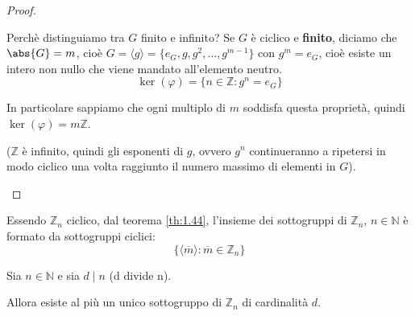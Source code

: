 \documentclass[../main.tex]{subfiles}
\begin{document}
\begin{proof}
    \begin{note}
        Perchè distinguiamo tra $G$ finito e infinito? Se $G$ è ciclico e \textbf{finito}, diciamo che $\abs{G} = m$, cioè $G = \langle g \rangle = \{e_G, g, g^2, \ldots, g^{m-1}\}$ con $g^m = e_G$, cioè esiste un intero non nullo che viene mandato all'elemento neutro.
        \[
            \ker (\varphi) = \{n \in \mathbb{Z} : g^n = e_G\}
        \]

        In particolare sappiamo che ogni multiplo di $m$ soddisfa questa proprietà, quindi $\ker(\varphi) = m \mathbb{Z}$.

        ($\mathbb{Z}$ è infinito, quindi gli esponenti di $g$, ovvero $g^n$ continueranno a ripetersi in modo ciclico una volta raggiunto il numero massimo di elementi in $G$).
    \end{note}
\end{proof}

\begin{corollary}
    Essendo $\mathbb{Z}_n$ ciclico, dal teorema \ref{th:1.44}, l'insieme dei sottogruppi di $\mathbb{Z}_n$, $n \in \mathbb{N}$ è formato da sottogruppi ciclici:
    \[
        \boxed{
            \{\langle \overline{m} \rangle : \overline{m} \in \mathbb{Z}_n \}
        }
    \]
\end{corollary}

\begin{proposition}
    Sia $n \in \mathbb{N}$ e sia $d \mid n$ (d divide n).

    Allora esiste al più un unico sottogruppo di $\mathbb{Z}_n$ di cardinalità $d$.
\end{proposition}
\end{document}
